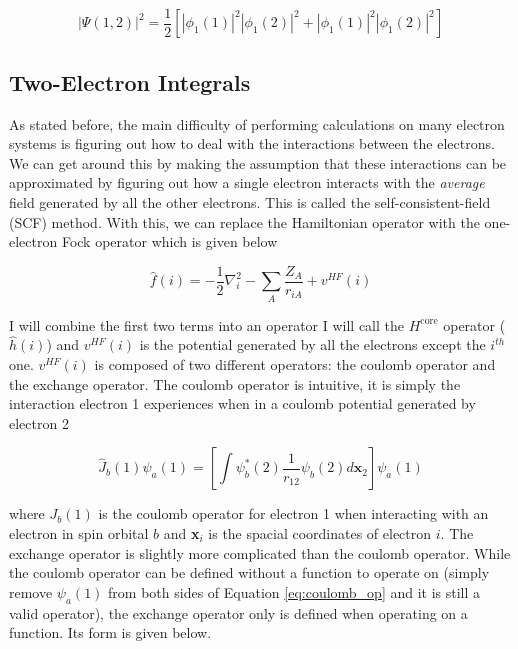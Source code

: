\documentclass[12pt]{report}
\begin{document}
\begin{equation}
\label{eq:el_prob_dist_4}
|\Psi(1,2)|^{2} =
\frac{1}{2}
\left[
|\phi_{1}(1)|^{2}|\phi_{1}(2)|^{2} + |\phi_{1}(1)|^{2}|\phi_{1}(2)|^{2}
\right]
\end{equation}

\subsection{Two-Electron Integrals}
As stated before, the main difficulty of performing calculations on many electron systems is figuring out how to deal with the interactions between the electrons. We can get around this by making the assumption that these interactions can be approximated by figuring out how a single electron interacts with the \textit{average} field generated by all the other electrons. This is called the self-consistent-field (SCF) method\cite{RHF}. With this, we can replace the Hamiltonian operator with the one-electron Fock operator which is given below\cite{Ostlund}

\begin{equation}
\label{eq:fock_op}
\hat{f}(i) = -\frac{1}{2}\nabla^{2}_{i}  - \sum_{A}\frac{Z_{A}}{r_{iA}} + v^{HF}(i)
\end{equation} 

I will combine the first two terms into an operator I will call the $H^{\text{core}}$ operator ($\hat{h}(i)$) and $v^{HF}(i)$ is the potential generated by all the electrons except the $i^{th}$ one. $v^{HF}(i)$ is composed of two different operators: the coulomb operator and the exchange operator. The coulomb operator is intuitive, it is simply the interaction electron 1 experiences when in a coulomb potential generated by electron 2

\begin{equation}
\label{eq:coulomb_op}
\hat{J}_{b}(1)\psi_{a}(1)=\left[\int\psi^{*}_{b}(2)\frac{1}{r_{12}}\psi_{b}(2)d\textbf{x}_{2}\right]\psi_{a}(1)
\end{equation} 

where $J_{b}(1)$ is the coulomb operator for electron 1 when interacting with an electron in spin orbital $b$ and \textbf{x}$_{i}$ is the spacial coordinates of electron $i$. The exchange operator is slightly more complicated than the coulomb operator. While the coulomb operator can be defined without a function to operate on (simply remove $\psi_{a}(1)$ from both sides of Equation \ref{eq:coulomb_op} and it is still a valid operator), the exchange operator only is defined when operating on a function. Its form is given below.
\end{document}
